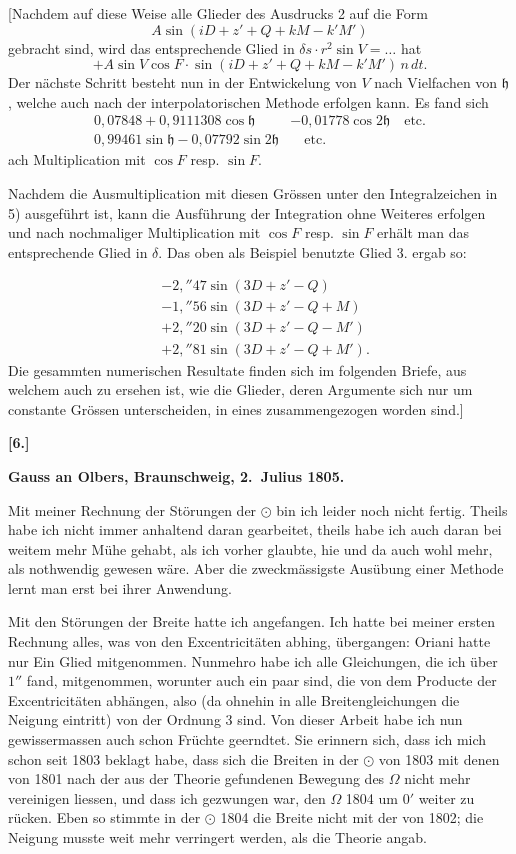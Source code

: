 \documentclass[12pt,a4paper]{article}
\newcommand{\Ceres}{\odot}
\newcommand{\Jupiter}{\mathfrak{h}}
\begin{document}
[Nachdem auf diese Weise alle Glieder des Ausdrucks 2 auf die Form
\[A \sin(iD + z' + Q + kM - k'M')\]
gebracht sind, wird das entsprechende Glied in $\delta s \cdot r^2 \sin V = \ldots$ hat
\[+ A \sin V \cos F \cdot \sin(iD + z' + Q + kM - k'M') \, n\,dt.\]
Der nächste Schritt besteht nun in der Entwickelung von $V$ nach Vielfachen von $\Jupiter$, welche auch nach der interpolatorischen Methode erfolgen kann. Es fand sich
\begin{align*}
0{,}07848 + 0{,}9111308 \cos \Jupiter &- 0{,}01778 \cos 2\Jupiter \quad \text{etc.}\\
0{,}99461 \sin \Jupiter - 0{,}07792 \sin 2\Jupiter &\quad \text{etc.}
\end{align*}
ach Multiplication mit $\cos F$ resp. $\sin F$.

Nachdem die Ausmultiplication mit diesen Grössen unter den Integralzeichen in 5) ausgeführt ist, kann die Ausführung der Integration ohne Weiteres erfolgen und nach nochmaliger Multiplication mit $\cos F$ resp. $\sin F$ erhält man das entsprechende Glied in $\delta$. Das oben als Beispiel benutzte Glied 3. ergab so:

\newpage
\setcounter{page}{417}
%
\begin{align*}
&-2{,}''47 \sin(3D + z' - Q)\\
&-1{,}''56 \sin(3D + z' - Q + M)\\
&+2{,}''20 \sin(3D + z' - Q - M')\\
&+2{,}''81 \sin(3D + z' - Q + M').
\end{align*}
Die gesammten numerischen Resultate finden sich im folgenden Briefe, aus welchem auch zu ersehen ist, wie die Glieder, deren Argumente sich nur um constante Grössen unterscheiden, in eines zusammengezogen worden sind.]

\medskip\noindent\textbf{[6.]}

\medskip\noindent
\textbf{Gauss an Olbers, Braunschweig, 2.~Julius 1805.}

Mit meiner Rechnung der Störungen der $\Ceres$ bin ich leider noch nicht fertig. Theils habe ich nicht immer anhaltend daran gearbeitet, theils habe ich auch daran bei weitem mehr Mühe gehabt, als ich vorher glaubte, hie und da auch wohl mehr, als nothwendig gewesen wäre. Aber die zweckmässigste Ausübung einer Methode lernt man erst bei ihrer Anwendung.

Mit den Störungen der Breite hatte ich angefangen. Ich hatte bei meiner ersten Rechnung alles, was von den Excentricitäten abhing, übergangen: Oriani hatte nur Ein Glied mitgenommen. Nunmehro habe ich alle Gleichungen, die ich über $1''$ fand, mitgenommen, worunter auch ein paar sind, die von dem Producte der Excentricitäten abhängen, also (da ohnehin in alle Breitengleichungen die Neigung eintritt) von der Ordnung 3 sind. Von dieser Arbeit habe ich nun gewissermassen auch schon Früchte geerndtet. Sie erinnern sich, dass ich mich schon seit 1803 beklagt habe, dass sich die Breiten in der $\Ceres$ von 1803 mit denen von 1801 nach der aus der Theorie gefundenen Bewegung des $\Omega$ nicht mehr vereinigen liessen, und dass ich gezwungen war, den $\Omega$ 1804 um $0'$ weiter zu rücken. Eben so stimmte in der $\Ceres$ 1804 die Breite nicht mit der von 1802; die Neigung musste weit mehr verringert werden, als die Theorie angab.
\end{document}
